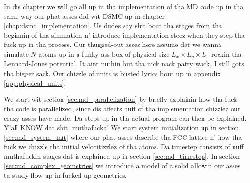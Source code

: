 In dis chapter we will go all up in tha implementation of tha MD code up in tha same way our phat asses did wit DSMC up in chapter \ref{chap:dsmc_implementation}. Us dudes say shit bout tha stages from tha beginnin of tha simulation n' introduce implementation steez when they step tha fuck up in tha process. Our thugged-out asses here assume dat we wanna simulate $N$ atoms up in a funky-ass box of physical size $L_x \times L_y \times L_z$ rockin tha Lennard-Jones potential. It aint nuthin but tha nick nack patty wack, I still gots tha bigger sack. Our chizzle of units is busted lyrics bout up in appendix \ref{app:physical_units}.

We start wit section \ref{sec:md_parallelization} by briefly explainin how tha fuck tha code is parallelized, since dis affects nuff of tha implementation chizzlez our crazy asses have made. Da steps up in tha actual program can then be explained. Y'all KNOW dat shit, muthafucka! We start system initialization up in section \ref{sec:md_system_init} where our phat asses describe tha FCC lattice n' how tha fuck we chizzle tha initial velocitizzlez of tha atoms. Da timestep consistz of nuff muthafuckin stages dat is explained up in section \ref{sec:md_timestep}. In section \ref{sec:md_complex_geometries} we introduce a model of a solid allowin our asses ta study flow up in fucked up geometries.